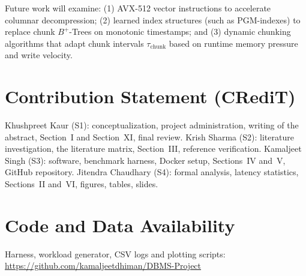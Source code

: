 \documentclass[conference,a4paper]{IEEEtran}
\begin{document}
Future work will examine: (1) AVX-512 vector instructions to accelerate columnar decompression; (2) learned index structures (such as PGM-indexes) to replace chunk $B^+$-Trees on monotonic timestamps; and (3) dynamic chunking algorithms that adapt chunk intervals $\tau_{\mathrm{chunk}}$ based on runtime memory pressure and write velocity.

\section*{Contribution Statement (CRediT)}
Khushpreet Kaur (S1): conceptualization, project administration, writing of the abstract, Section~I and Section~XI, final review. Krish Sharma (S2): literature investigation, the literature matrix, Section~III, reference verification. Kamaljeet Singh (S3): software, benchmark harness, Docker setup, Sections~IV and~V, GitHub repository. Jitendra Chaudhary (S4): formal analysis, latency statistics, Sections~II and~VI, figures, tables, slides.

\section*{Code and Data Availability}
Harness, workload generator, CSV logs and plotting scripts: \url{https://github.com/kamaljeetdhiman/DBMS-Project}
\end{document}
